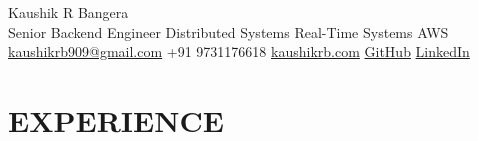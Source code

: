 \documentclass[a4paper,10pt]{article}
\begin{document}
\RaggedRight

{\fontsize{26}{30}\selectfont Kaushik R Bangera}\\[2pt]
{\color{accent}\large Senior Backend Engineer \textbar{} Distributed Systems \textbar{} Real-Time Systems \textbar{} AWS}\\[2pt]
\href{mailto:kaushikrb909@gmail.com}{kaushikrb909@gmail.com} \textbar{} +91 9731176618 \textbar{} \href{https://kaushikrb.com/?utm_source=resume}{kaushikrb.com} \textbar{} \href{https://github.com/NeuronEnix}{GitHub} \textbar{} \href{https://www.linkedin.com/in/kaushik-r-bangera/}{LinkedIn}

\vspace{3pt}

\noindent
\begin{minipage}[t]{0.60\textwidth}

\section*{EXPERIENCE}


\end{minipage}
\end{document}
